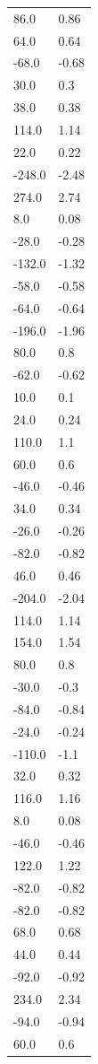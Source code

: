 \begin{longtable}{ll}
86.0 & 0.86 \\
64.0 & 0.64 \\
-68.0 & -0.68 \\
30.0 & 0.3 \\
38.0 & 0.38 \\
114.0 & 1.14 \\
22.0 & 0.22 \\
-248.0 & -2.48 \\
274.0 & 2.74 \\
8.0 & 0.08 \\
-28.0 & -0.28 \\
-132.0 & -1.32 \\
-58.0 & -0.58 \\
-64.0 & -0.64 \\
-196.0 & -1.96 \\
80.0 & 0.8 \\
-62.0 & -0.62 \\
10.0 & 0.1 \\
24.0 & 0.24 \\
110.0 & 1.1 \\
60.0 & 0.6 \\
-46.0 & -0.46 \\
34.0 & 0.34 \\
-26.0 & -0.26 \\
-82.0 & -0.82 \\
46.0 & 0.46 \\
-204.0 & -2.04 \\
114.0 & 1.14 \\
154.0 & 1.54 \\
80.0 & 0.8 \\
-30.0 & -0.3 \\
-84.0 & -0.84 \\
-24.0 & -0.24 \\
-110.0 & -1.1 \\
32.0 & 0.32 \\
116.0 & 1.16 \\
8.0 & 0.08 \\
-46.0 & -0.46 \\
122.0 & 1.22 \\
-82.0 & -0.82 \\
-82.0 & -0.82 \\
68.0 & 0.68 \\
44.0 & 0.44 \\
-92.0 & -0.92 \\
234.0 & 2.34 \\
-94.0 & -0.94 \\
60.0 & 0.6 \\

\end{longtable}
